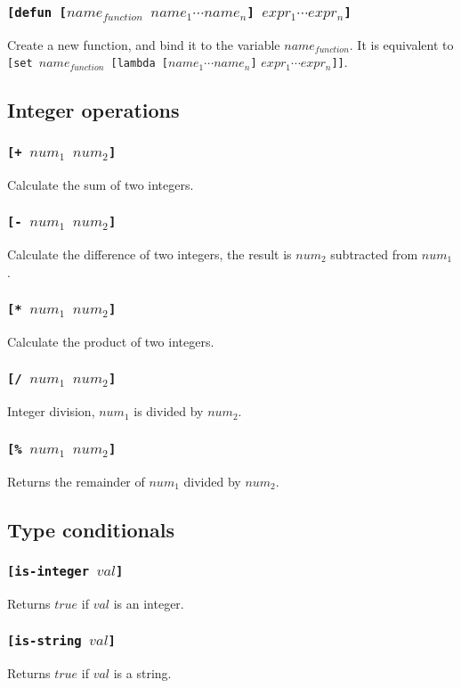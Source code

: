 \subsubsection{\tt{[defun [}$name_{function}$ $name_1 \cdots name_n$\tt{]} $expr_1 \cdots expr_n$\tt{]}}
Create a new function, and bind it to the variable $name_{function}$. It is equivalent to {\tt{[set }}$name_{function}${\tt{ [lambda [}}$name_1 \cdots name_n${\tt{]}} $expr_1 \cdots expr_n${\tt{]]}}.

\subsection{Integer operations}
\subsubsection{\tt{[+ }$num_1$ $num_2$\tt{]}}
Calculate the sum of two integers.
\subsubsection{\tt{[- }$num_1$ $num_2$\tt{]}}
Calculate the difference of two integers, the result is $num_2$ subtracted from $num_1$.
\subsubsection{\tt{[* }$num_1$ $num_2$\tt{]}}
Calculate the product of two integers.
\subsubsection{\tt{[/ }$num_1$ $num_2$\tt{]}}
Integer division, $num_1$ is divided by $num_2$.
\subsubsection{\tt{[\% }$num_1$ $num_2$\tt{]}}
Returns the remainder of $num_1$ divided by $num_2$.

\subsection{Type conditionals}
\subsubsection{\tt{[is-integer }$val$\tt{]}}
Returns $true$ if $val$ is an integer.
\subsubsection{\tt{[is-string }$val$\tt{]}}
Returns $true$ if $val$ is a string.
